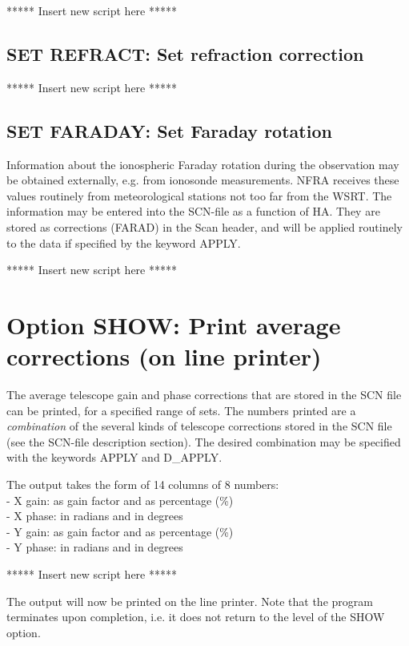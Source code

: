 ***** Insert new script here *****

\subsection{SET REFRACT: Set refraction correction}
\label{.set.refract}

***** Insert new script here *****

\subsection{SET FARADAY: Set Faraday rotation}
\label{.set.faraday}

Information about the ionospheric Faraday rotation during the observation may
be obtained externally, e.g. from ionosonde measurements. NFRA receives these
values routinely from meteorological stations not too far from the WSRT. The
information may be entered into the SCN-file as a function of HA. They are
stored as corrections (FARAD) in the Scan header, and will be applied routinely
to the data if specified by the keyword APPLY.

***** Insert new script here *****

\newpage
\section{Option SHOW: Print average corrections (on line printer)}
\label{.option.show}

The average telescope gain and phase corrections that are stored in the SCN
file can be printed, for a specified range of sets. The numbers printed are a
{\em combination} of the several kinds of telescope corrections stored in the
SCN file (see the SCN-file description section). The desired combination may be
specified with the keywords APPLY and D\_APPLY.

The output takes the form of 14 columns of 8 numbers:
\\- X gain: as gain factor and as percentage (\%)
\\- X phase: in radians and in degrees
\\- Y gain: as gain factor and as percentage (\%)
\\- Y phase: in radians and in degrees

***** Insert new script here *****

The output will now be printed on the line printer. Note that the program
terminates upon completion, i.e. it does not return to the level of the SHOW
option.



